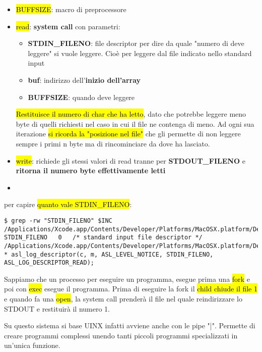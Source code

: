 \begin{itemize}
	\item \hl{BUFFSIZE}: macro di preprocessore
	\item \hl{read}: \textbf{system call} con parametri: 
	
		\begin{itemize}
			\item \textbf{STDIN\_FILENO}: file descriptor per dire da quale "numero di deve leggere" si vuole leggere. Cioè per leggere dal file indicato nello standard input
			\item \textbf{buf}: indirizzo dell'\textbf{inizio dell'array}
			\item \textbf{BUFFSIZE}: quando deve leggere
		\end{itemize}
		
		\hl{Restituisce il numero di char che ha letto}, dato che potrebbe leggere meno byte di quelli richiesti nel caso in cui il file ne contenga di meno. Ad ogni sua iterazione \hl{si ricorda la "posizione nel file"} che gli permette di non leggere sempre i primi n byte ma di rincominciare da dove ha lasciato.
	
	\item \hl{write}: richiede gli stessi valori di read tranne per \textbf{STDOUT\_FILENO} e \textbf{ritorna il numero byte effettivamente letti}
	\item 
\end{itemize}


per capire \hl{quanto vale STDIN\_FILENO}:


\begin{lstlisting}
$ grep -rw "STDIN_FILENO" $INC
/Applications/Xcode.app/Contents/Developer/Platforms/MacOSX.platform/Developer/SDKs/MacOSX.sdk/usr/include//unistd.h:#define	 STDIN_FILENO	0	/* standard input file descriptor */
/Applications/Xcode.app/Contents/Developer/Platforms/MacOSX.platform/Developer/SDKs/MacOSX.sdk/usr/include//asl.h: * asl_log_descriptor(c, m, ASL_LEVEL_NOTICE, STDIN_FILENO, ASL_LOG_DESCRIPTOR_READ);
\end{lstlisting}


Sappiamo che un processo per eseguire un programma, esegue prima una \hl{fork} e poi con \hl{exec} esegue il programma. Prima di eseguire la fork il \hl{child chiude il file 1} e quando fa una \hl{open}, la system call prenderà il file nel quale reindirizzare lo STDOUT e restituirà il numero 1.

Su questo sistema si base UINX infatti avviene anche con le pipe "|". Permette di creare programmi complessi unendo tanti piccoli programmi specializzati in un'unica funzione.

